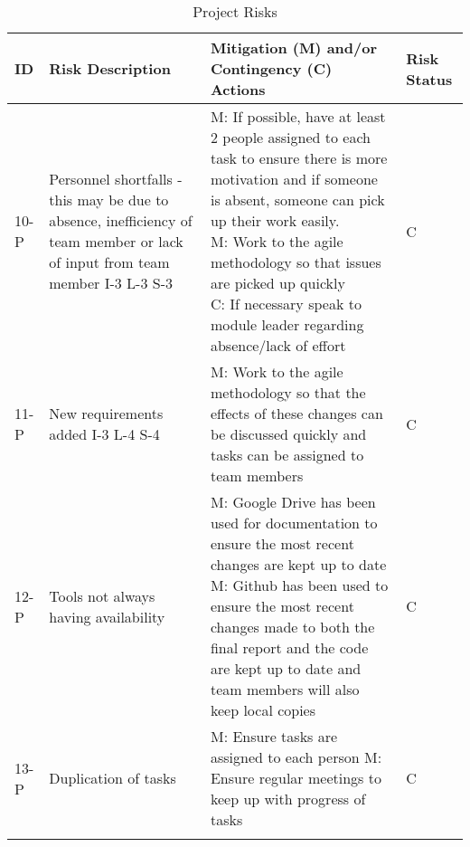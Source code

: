 
\newcommand{\specialcell}[2][c]{%
  \begin{tabular}[#1]{@{}p{0.5\textwidth}@{}}#2\end{tabular}}
  
\centering
\begin{longtable}{|p{}|m{}|p{}|p{}|}
    \hline
        \textbf{ID} & \textbf{Risk Description} & \textbf{Mitigation (M) and/or Contingency (C) Actions} & \textbf{Risk Status} \\
    \hline
    10-P & Personnel shortfalls - this may be due to absence, inefficiency of team member or lack of input from team member
    I-3 L-3 S-3 & \specialcell{M: If possible, have at least 2 people assigned to each task to ensure there is more motivation and if someone is absent, someone can pick up their work easily.\\
    M: Work to the agile methodology so that issues are picked up quickly \\
    C: If necessary speak to module leader regarding absence/lack of effort} & C \\
    \hline
    11-P & New requirements added
    I-3 L-4 S-4 & M: Work to the agile methodology so that the effects of these changes can be discussed quickly and tasks can be assigned to team members & C \\
    \hline
    12-P & Tools not always having availability & \specialcell{M: Google Drive has been used for documentation to ensure the most recent changes are kept up to date\\
    M: Github has been used to ensure the most recent changes made to both the final report and the code are kept up to date and team members will also keep local copies} & C \\
    \hline
    13-P & Duplication of tasks & M: Ensure tasks are assigned to each person
    M: Ensure regular meetings to keep up with progress of tasks & C \\
    \hline
    \caption{Project Risks}
    \label{tab:projectrisks}
\end{longtable}

